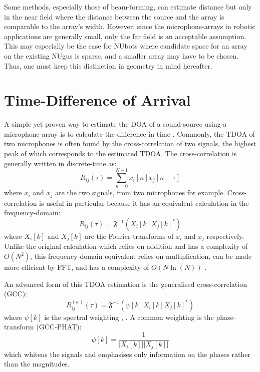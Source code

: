 \documentclass[notitlepage]{report}
\begin{document}
Some methods, especially those of beam-forming, can estimate distance but only in the near field where the distance between the source and the array is comparable to the array's width. However, since the microphone-arrays in robotic applications are generally small, only the far field is an acceptable assumption. This may especially be the case for NUbots where candidate space for an array on the existing NUgus is sparse, and a smaller array may have to be chosen. Thus, one must keep this distinction in geometry in mind hereafter.

\section{Time-Difference of Arrival} \label{Time_Difference_of_Arrival}

A simple yet proven way to estimate the DOA of a sound-source using a microphone-array is to calculate the difference in time \cite{argentieri_survey_2015}. Commonly, the TDOA of two microphones is often found by the cross-correlation of two signals, the highest peak of which corresponds to the estimated TDOA. The cross-correlation is generally written in discrete-time as:
\begin{equation}
R_{ij}(\tau) = \sum_{n=0}^{N-1} x_i[n]x_j[n-\tau]
\end{equation}
where $x_i$ and $x_j$ are the two signals, from two microphones for example. Cross-correlation is useful in particular because it has an equivalent calculation in the frequency-domain:
\begin{equation}
R_{ij}(\tau) = \mathfrak{F}^{-1} \left( X_i[k]X_j[k]^* \right)
\end{equation}
where $X_i[k]$ and $X_j[k]$ are the Fourier transforms of $x_i$ and $x_j$ respectively. Unlike the original calculation which relies on addition and has a complexity of $O(N^2)$, this frequency-domain equivalent relies on multiplication, can be made more efficient by FFT, and has a complexity of $O\left(N\ln(N)\right)$ \cite{valin_robust_2003}.

An advanced form of this TDOA estimation is the generalised cross-correlation (GCC):
\begin{equation}
R^{(w)}_{ij}(\tau) = \mathfrak{F}^{-1} \left( \psi[k]X_i[k]X_j[k]^* \right)
\end{equation}
where $\psi[k]$ is the spectral weighting \cite{argentieri_survey_2015}, \cite{rascon_localization_2017}. A common weighting is the phase-transform (GCC-PHAT):
\begin{equation}
\psi[k] = \frac{1}{\lvert X_i[k] \rvert \lvert X_j[k] \rvert}
\end{equation}
which whitens the signals and emphasises only information on the phases rather than the magnitudes.
\end{document}
